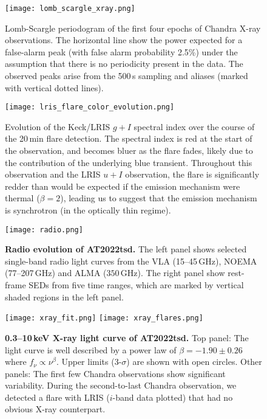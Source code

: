 \documentclass{nature_plusfigure}
\newcommand{\at}{AT2022tsd}
\begin{document}
\begin{extended_data}
\begin{figure*}[!ht]
    \centering
    \texttt{[image: lomb\_scargle\_xray.png]}
    \caption{Lomb-Scargle periodogram of the first four epochs of Chandra X-ray observations. The horizontal line show the power expected for a false-alarm peak (with false alarm probability 2.5\%) under the assumption that there is no periodicity present in the data. The observed peaks arise from the 500\,s sampling and aliases (marked with vertical dotted lines).}
    \label{fig:xray-periodogram}
\end{figure*}

\begin{figure*}[!ht]
    \centering
    \texttt{[image: lris\_flare\_color\_evolution.png]}
    \caption{Evolution of the Keck/LRIS $g+I$ spectral index over the course of the 20\,min flare detection. The spectral index is red at the start of the observation, and becomes bluer as the flare fades, likely due to the contribution of the underlying blue transient. Throughout this observation and the LRIS $u+I$ observation, the flare is significantly redder than would be expected if the emission mechanism were thermal ($\beta=2$), leading us to suggest that the emission mechanism is synchrotron (in the optically thin regime).}
    \label{fig:keck-flare-color-evolution}
\end{figure*}

\begin{figure}[!ht]
 \centering
\texttt{[image: radio.png]}
  \caption{\textbf{Radio evolution of \at.} The left panel shows selected single-band radio light curves from the VLA (15--45\,GHz), NOEMA (77--207\,GHz) and ALMA ($350$\,GHz). The right panel show rest-frame SEDs from five time ranges, which are marked by vertical shaded regions in the left panel.}
 \label{fig:radio}
\end{figure}

\begin{figure}[!ht]
 \centering
\texttt{[image: xray\_fit.png]}
\texttt{[image: xray\_flares.png]}
  \caption{\textbf{0.3--10\,keV X-ray light curve of \at.} Top panel: The light curve is well described by a power law of $\beta=-1.90\pm0.26$ where $f_\nu \propto \nu^{\beta}$. Upper limits (3-$\sigma$) are shown with open circles. Other panels: The first few Chandra observations show significant variability. During the second-to-last Chandra observation, we detected a flare with LRIS ($i$-band data plotted) that had no obvious X-ray counterpart.}
 \label{fig:xray-lc}
\end{figure}


\end{extended_data}
\end{document}
